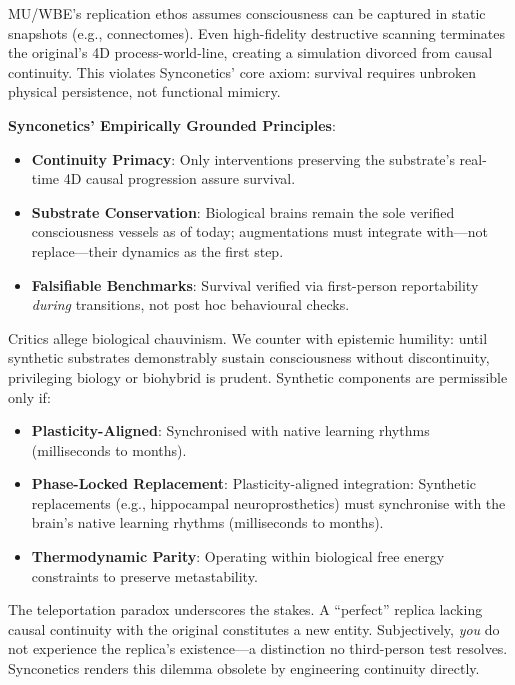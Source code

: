 \documentclass[10pt]{article}
\begin{document}
\begin{sloppypar}
  MU/WBE’s replication ethos assumes consciousness can be captured in static snapshots (e.g., connectomes). Even high-fidelity destructive scanning terminates the original’s 4D process-world-line, creating a simulation divorced from causal continuity. This violates Synconetics’ core axiom: survival requires unbroken physical persistence, not functional mimicry.

  \textbf{Synconetics’ Empirically Grounded Principles}:
  \begin{itemize}
    \item \textbf{Continuity Primacy}: Only interventions preserving the substrate’s real-time 4D causal progression assure survival.
    \item \textbf{Substrate Conservation}: Biological brains remain the sole verified consciousness vessels as of today; augmentations must integrate with—not replace—their dynamics as the first step.
    \item \textbf{Falsifiable Benchmarks}: Survival verified via first-person reportability \textit{during} transitions, not post hoc behavioural checks.
  \end{itemize}

  Critics allege biological chauvinism. We counter with epistemic humility: until synthetic substrates demonstrably sustain consciousness without discontinuity, privileging biology or biohybrid is prudent. Synthetic components are permissible only if:

  \begin{itemize}
    \item \textbf{Plasticity-Aligned}: Synchronised with native learning rhythms (milliseconds to months).
    \item \textbf{Phase-Locked Replacement}: Plasticity-aligned integration: Synthetic replacements (e.g., hippocampal neuroprosthetics) must synchronise with the brain’s native learning rhythms (milliseconds to months).
    \item \textbf{Thermodynamic Parity}: Operating within biological free energy constraints to preserve metastability.
  \end{itemize}

  The teleportation paradox underscores the stakes. A “perfect” replica lacking causal continuity with the original constitutes a new entity. Subjectively, \textit{you} do not experience the replica’s existence—a distinction no third-person test resolves. Synconetics renders this dilemma obsolete by engineering continuity directly.


\end{sloppypar}
\end{document}
